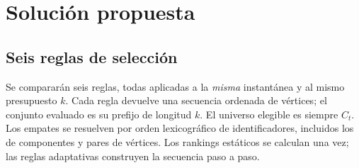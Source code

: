 \documentclass[journal]{IEEEtran}
\begin{document}
\section{Solución propuesta}

\subsection{Seis reglas de selección}

Se compararán seis reglas, todas aplicadas a la \emph{misma} instantánea y al
mismo presupuesto $k$. Cada regla devuelve una secuencia ordenada de vértices;
el conjunto evaluado es su prefijo de longitud $k$. El universo elegible es
siempre $C_t$. Los empates se resuelven por orden lexicográfico de identificadores,
incluidos los de componentes y pares de vértices. Los rankings estáticos se
calculan una vez; las reglas adaptativas construyen la secuencia paso a paso.
\end{document}
